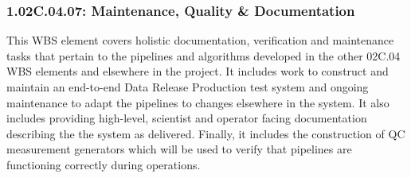 \subsubsection*{1.02C.04.07: Maintenance, Quality \& Documentation}

This WBS element covers holistic documentation, verification and
maintenance tasks that pertain to the pipelines and algorithms developed
in the other 02C.04 WBS elements and elsewhere in the project. It
includes work to construct and maintain an end-to-end Data Release
Production test system and ongoing maintenance to adapt the pipelines to
changes elsewhere in the system. It also includes providing high-level,
scientist and operator facing documentation describing the the system as
delivered. Finally, it includes the construction of QC measurement generators
which will be used to verify that pipelines are functioning correctly during
operations.
